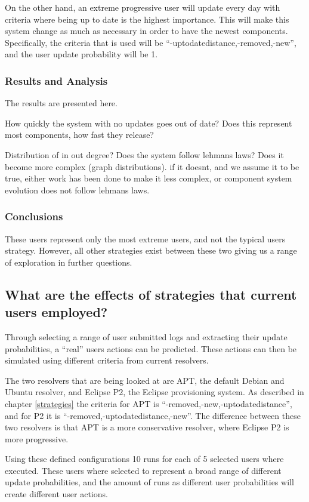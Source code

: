 On the other hand, an extreme progressive user will update every day with criteria where being up to date is the highest importance.
This will make this system change as much as necessary in order to have the newest components.
Specifically, the criteria that is used will be ``-uptodatedistance,-removed,-new'', and the user update probability will be 1.

\subsubsection{Results and Analysis}
The results are presented here.

How quickly the system with no updates goes out of date?
Does this represent most components, how fast they release?

Distribution of in out degree?
Does the system follow lehmans laws?
Does it become more complex (graph distributions).
if it doesnt, and we assume it to be true, either work has been done to make it less complex, or component system evolution does not follow lehmans laws.

\subsubsection{Conclusions}
These users represent only the most extreme users, and not the typical users strategy.
However, all other strategies exist between these two giving us a range of exploration in further questions.

\subsection{What are the effects of strategies that current users employed?}
Through selecting a range of user submitted logs and extracting their update probabilities, a ``real'' users actions can be predicted.
These actions can then be simulated using different criteria from current resolvers.

The two resolvers that are being looked at are APT, the default Debian and Ubuntu resolver, and Eclipse P2, the Eclipse provisioning system.
As described in chapter \ref{strategies} the criteria for APT is ``-removed,-new,-uptodatedistance'', and for P2 it is ``-removed,-uptodatedistance,-new''.
The difference between these two resolvers is that APT is a more conservative resolver, where Eclipse P2 is more progressive.

Using these defined configurations 10 runs for each of 5 selected users where executed. 
These users where selected to represent a broad range of different update probabilities, and the amount of runs as different user probabilities will create different user actions.

